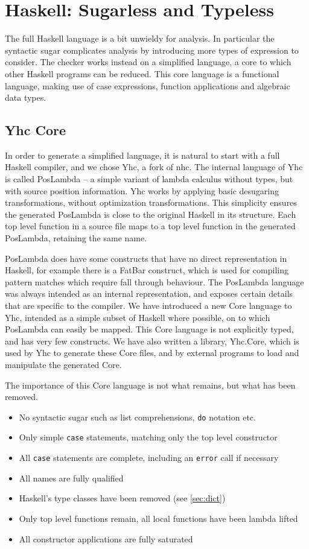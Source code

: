 \documentclass[preprint]{sigplanconf}
\newcommand{\T}[1]{\texttt{#1}}
\begin{document}
\section{Haskell: Sugarless and Typeless}
\label{chap:yhc}

The full Haskell language is a bit unwieldy for analysis. In particular the
syntactic sugar complicates analysis by introducing more types of expression to
consider. The checker works instead on a simplified language, a core to which
other Haskell programs can be reduced. This core language is a functional
language, making use of case expressions, function applications and algebraic
data types.

\subsection{Yhc Core}

In order to generate a simplified language, it is natural to start with a full
Haskell compiler, and we chose Yhc, a fork of nhc. The internal language of Yhc
is called PosLambda -- a simple variant of lambda calculus without types, but
with source position information. Yhc works by applying basic desugaring
transformations, without optimization transformations. This simplicity ensures
the generated PosLambda is close to the original Haskell in its structure. Each
top level function in a source file maps to a top level function in the
generated PosLambda, retaining the same name.

PosLambda does have some constructs that have no direct representation in
Haskell, for example there is a FatBar construct, which is used for compiling
pattern matches which require fall through behaviour. The PosLambda language
was always intended as an internal representation, and exposes certain details
that are specific to the compiler. We have introduced a new Core language to
Yhc, intended as a simple subset of Haskell where possible, on to which
PosLambda can easily be mapped. This Core language is not explicitly typed, and
has very few constructs. We have also written a library, Yhc.Core, which is
used by Yhc to generate these Core files, and by external programs to load and
manipulate the generated Core.

The importance of this Core language is not what remains, but what has been
removed.

\begin{itemize}
\item No syntactic sugar such as list comprehensions, \T{do} notation etc.
\item Only simple \T{case} statements, matching only the top level constructor
\item All \T{case} statements are complete, including an \T{error} call if
necessary
\item All names are fully qualified
\item Haskell's type classes have been removed (see \ref{sec:dict})
\item Only top level functions remain, all local functions have been lambda lifted
\item All constructor applications are fully saturated
\end{itemize}
\end{document}
